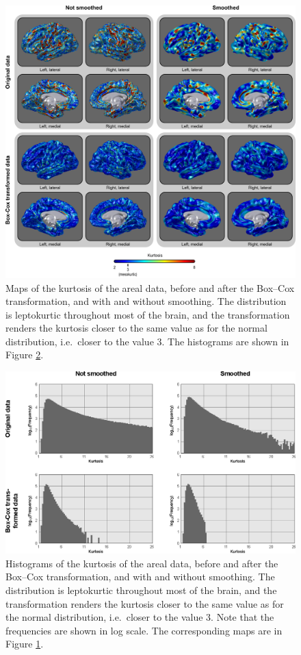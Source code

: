 \begin{figure}[!p]  %
\centering
\includegraphics[width=14cm]{images/kurtosis.png}
\caption[Maps of the kurtosis of the areal data.]{Maps of the kurtosis of the areal data, before and after the Box--Cox transformation, and with and without smoothing. The distribution is leptokurtic throughout most of the brain, and the transformation renders the kurtosis closer to the same value as for the normal distribution, i.e.\ closer to the value 3. The histograms are shown in Figure \ref{fig:areal:kurtosis-hist}.}
\label{fig:areal:kurtosis}
\end{figure}

\begin{figure}[!p]  %
\centering
\includegraphics[width=14cm]{images/kurtosis-hist.eps}
\caption[Histograms of the kurtosis of the areal data.]{Histograms of the kurtosis of the areal data, before and after the Box--Cox transformation, and with and without smoothing. The distribution is leptokurtic throughout most of the brain, and the transformation renders the kurtosis closer to the same value as for the normal distribution, i.e.\ closer to the value 3.  Note that the frequencies are shown in log scale. The corresponding maps are in Figure \ref{fig:areal:kurtosis}.}
\label{fig:areal:kurtosis-hist}
\end{figure}

